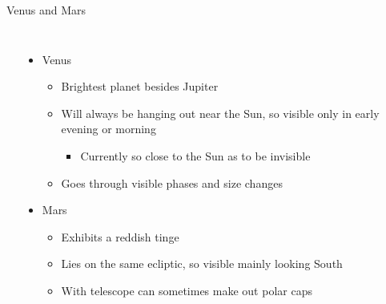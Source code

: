 \documentclass[pdf, ]{beamer}
\begin{document}
\begin{frame}{Venus and Mars}
\begin{columns}
\begin{center}
		\end{center}
		\begin{itemize}
			\item<1-> Venus
				\begin{itemize}
					\item Brightest planet besides Jupiter
					\item Will always be hanging out near the Sun, so visible only in early evening or morning
						\begin{itemize}
							\item Currently so close to the Sun as to be invisible
						\end{itemize}
					\item Goes through visible phases and size changes
				\end{itemize}
			\item<2-> Mars
				\begin{itemize}
					\item Exhibits a reddish tinge
					\item Lies on the same ecliptic, so visible mainly looking South
					\item With telescope can sometimes make out polar caps
				\end{itemize}
		\end{itemize}
	\end{columns}
\end{frame}
\end{document}
